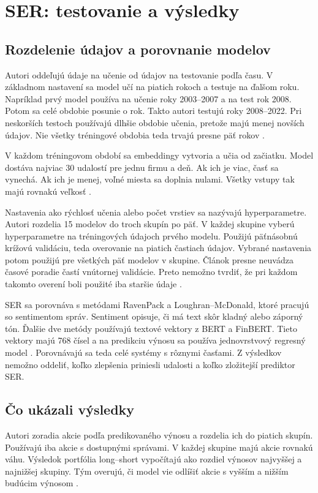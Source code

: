 \section{SER: testovanie a výsledky}
\subsection{Rozdelenie údajov a porovnanie modelov}
Autori oddeľujú údaje na učenie od údajov na testovanie podľa času. V základnom nastavení sa model učí na piatich rokoch a testuje na ďalšom roku. Napríklad prvý model používa na učenie roky 2003--2007 a na test rok 2008. Potom sa celé obdobie posunie o rok. Takto autori testujú roky 2008--2022. Pri neskorších testoch používajú dlhšie obdobie učenia, pretože majú menej novších údajov. Nie všetky tréningové obdobia teda trvajú presne päť rokov .

V každom tréningovom období sa embeddingy vytvoria a učia od začiatku. Model dostáva najviac 30 udalostí pre jednu firmu a deň. Ak ich je viac, časť sa vynechá. Ak ich je menej, voľné miesta sa doplnia nulami. Všetky vstupy tak majú rovnakú veľkosť .

Nastavenia ako rýchlosť učenia alebo počet vrstiev sa nazývajú hyperparametre. Autori rozdelia 15 modelov do troch skupín po päť. V každej skupine vyberú hyperparametre na tréningových údajoch prvého modelu. Použijú päťnásobnú krížovú validáciu, teda overovanie na piatich častiach údajov. Vybrané nastavenia potom použijú pre všetkých päť modelov v skupine. Článok presne neuvádza časové poradie častí vnútornej validácie. Preto nemožno tvrdiť, že pri každom takomto overení boli použité iba staršie údaje .

SER sa porovnáva s metódami RavenPack a Loughran--McDonald, ktoré pracujú so sentimentom správ. Sentiment opisuje, či má text skôr kladný alebo záporný tón. Ďalšie dve metódy používajú textové vektory z BERT a FinBERT. Tieto vektory majú 768 čísel a na predikciu výnosu sa používa jednovrstvový regresný model . Porovnávajú sa teda celé systémy s rôznymi časťami. Z výsledkov nemožno oddeliť, koľko zlepšenia priniesli udalosti a koľko zložitejší prediktor SER.

\subsection{Čo ukázali výsledky}
Autori zoradia akcie podľa predikovaného výnosu a rozdelia ich do piatich skupín. Používajú iba akcie s dostupnými správami. V každej skupine majú akcie rovnakú váhu. Výsledok portfólia long--short vypočítajú ako rozdiel výnosov najvyššej a najnižšej skupiny. Tým overujú, či model vie odlíšiť akcie s vyšším a nižším budúcim výnosom .


